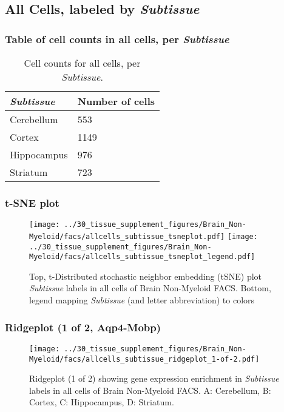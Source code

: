 \clearpage

\subsection{All Cells, labeled by \emph{Subtissue}}
\subsubsection{Table of cell counts in all cells, per \emph{Subtissue}}\begin{table}[h]
\centering
\label{my-label}
\begin{tabular}{@{}ll@{}}
\toprule

\emph{Subtissue}& Number of cells \\ \midrule
Cerebellum & 553 \\

Cortex & 1149 \\

Hippocampus & 976 \\

Striatum & 723 \\
\bottomrule
\end{tabular}
\caption{Cell counts for all cells, per \emph{Subtissue}.}
\end{table}

\clearpage
\subsubsection{t-SNE plot}
\begin{figure}[h]
\centering
\texttt{[image: ../30\_tissue\_supplement\_figures/Brain\_Non-Myeloid/facs/allcells\_subtissue\_tsneplot.pdf]}
\texttt{[image: ../30\_tissue\_supplement\_figures/Brain\_Non-Myeloid/facs/allcells\_subtissue\_tsneplot\_legend.pdf]}
\caption{Top, t-Distributed stochastic neighbor embedding (tSNE) plot  \emph{Subtissue} labels in all cells of Brain Non-Myeloid FACS. Bottom, legend mapping \emph{Subtissue} (and letter abbreviation) to colors}
\end{figure}


\clearpage

\subsubsection{Ridgeplot (1 of 2, Aqp4-Mobp)}
\begin{figure}[h]
\centering
\texttt{[image: ../30\_tissue\_supplement\_figures/Brain\_Non-Myeloid/facs/allcells\_subtissue\_ridgeplot\_1-of-2.pdf]}

\caption{ Ridgeplot (1 of 2)  showing gene expression enrichment in \emph{Subtissue} labels in all cells of Brain Non-Myeloid FACS. A: Cerebellum, B: Cortex, C: Hippocampus, D: Striatum.}
\end{figure}



